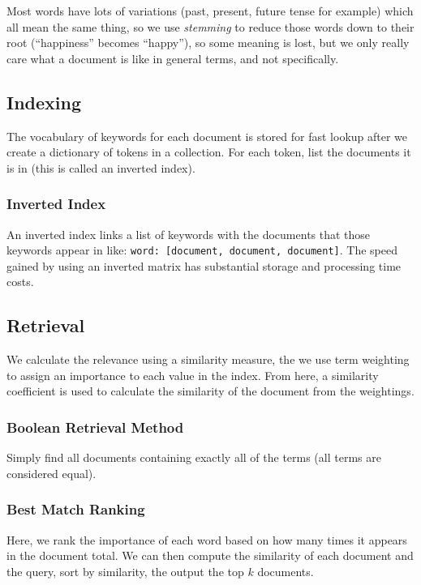 Most words have lots of variations (past, present, future tense for example) which all mean the same thing, so we use \emph{stemming} to reduce those words down to their root (``happiness'' becomes ``happy''), so some meaning is lost, but we only really care what a document is like in general terms, and not specifically.

\subsection{Indexing}\label{sub:indexing}

The vocabulary of keywords for each document is stored for fast lookup after we create a dictionary of tokens in a collection.
For each token, list the documents it is in (this is called an inverted index).

\subsubsection{Inverted Index}\label{ssub:inverted_index}

An inverted index links a list of keywords with the documents that those keywords appear in like: \texttt{{word: [document, document, document]}}.
The speed gained by using an inverted matrix has substantial storage and processing time costs.

\subsection{Retrieval}\label{sub:dsr10retrieval}

We calculate the relevance using a similarity measure, the we use term weighting to assign an importance to each value in the index.
From here, a similarity coefficient is used to calculate the similarity of the document from the weightings.

\subsubsection{Boolean Retrieval Method}\label{ssub:boolean_retrieval_method}

Simply find all documents containing exactly all of the terms (all terms are considered equal).

\subsubsection{Best Match Ranking}\label{ssub:best_match_ranking}

Here, we rank the importance of each word based on how many times it appears in the document total.
We can then compute the similarity of each document and the query, sort by similarity, the output the top \(k\) documents.
